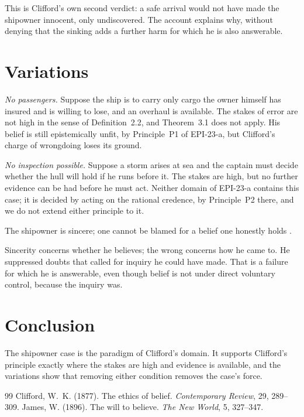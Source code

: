 \documentclass{situationist-preprint}
\begin{document}
This is Clifford's own second verdict: a safe arrival would not have made the shipowner innocent, only undiscovered. The account explains why, without denying that the sinking adds a further harm for which he is also answerable.

\section{Variations}

\emph{No passengers.} Suppose the ship is to carry only cargo the owner himself has insured and is willing to lose, and an overhaul is available. The stakes of error are not high in the sense of Definition~2.2, and Theorem~3.1 does not apply. His belief is still epistemically unfit, by Principle~P1 of EPI-23-a, but Clifford's charge of wrongdoing loses its ground.

\emph{No inspection possible.} Suppose a storm arises at sea and the captain must decide whether the hull will hold if he runs before it. The stakes are high, but no further evidence can be had before he must act. Neither domain of EPI-23-a contains this case; it is decided by acting on the rational credence, by Principle~P2 there, and we do not extend either principle to it.

\begin{objection}
The shipowner is sincere; one cannot be blamed for a belief one honestly holds \citep[cf.][]{James1896}.
\end{objection}

\begin{reply}
Sincerity concerns whether he believes; the wrong concerns how he came to. He suppressed doubts that called for inquiry he could have made. That is a failure for which he is answerable, even though belief is not under direct voluntary control, because the inquiry was.
\end{reply}

\section{Conclusion}

The shipowner case is the paradigm of Clifford's domain. It supports Clifford's principle exactly where the stakes are high and evidence is available, and the variations show that removing either condition removes the case's force.

\begin{thebibliography}{99}\small
{} Clifford, W.~K. (1877). The ethics of belief. \emph{Contemporary Review}, 29, 289--309.
 James, W. (1896). The will to believe. \emph{The New World}, 5, 327--347.
\end{thebibliography}
\end{document}
